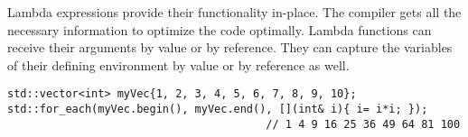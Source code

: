 Lambda expressions provide their functionality in-place. The compiler gets all the necessary information to optimize the code optimally. Lambda functions can receive their arguments by value or by reference. They can capture the variables of their defining environment by value or by reference as well.

\begin{lstlisting}[style=styleCXX]
std::vector<int> myVec{1, 2, 3, 4, 5, 6, 7, 8, 9, 10};
std::for_each(myVec.begin(), myVec.end(), [](int& i){ i= i*i; });
                                        // 1 4 9 16 25 36 49 64 81 100
\end{lstlisting}